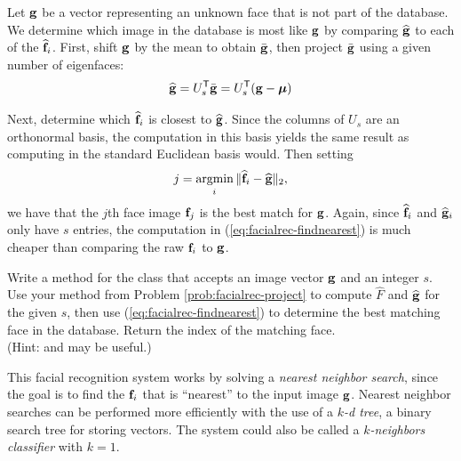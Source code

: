 Let $\mathbf{g}$ be a vector representing an unknown face that is not part of the database.
We determine which image in the database is most like $\mathbf{g}$ by comparing $\widehat{\mathbf{g}}$ to each of the $\widehat{\mathbf{f}}_i$.
First, shift $\mathbf{g}$ by the mean to obtain $\bar{\mathbf{g}}$, then project $\bar{\mathbf{g}}$ using a given number of eigenfaces:
\begin{equation}
    \widehat{\mathbf{g}} = U_s^{\mathsf T}\bar{\mathbf{g}} = U_s^{\mathsf T}(\mathbf{g} - \boldsymbol{\mu})
    \label{eq:facialrec-unknownface}
\end{equation}

Next, determine which $\widehat{\mathbf{f}}_i$ is closest to $\widehat{\mathbf{g}}$.
Since the columns of $U_s$ are an orthonormal basis, the computation in this basis yields the same result as computing in the standard Euclidean basis would.
Then setting
\begin{equation}
j = \mathop{{\text{argmin}}\vphantom{\sim}}\limits_{\displaystyle _{i}} \|\widehat{\f}_i - \widehat{\g}\|_2, %
\label{eq:facialrec-findnearest}
\end{equation}
we have that the $j$th face image $\mathbf{f}_j$ is the best match for $\mathbf{g}$.
Again, since $\widehat{\mathbf{f}}_i$ and $\widehat{\mathbf{g}}_i$ only have $s$ entries, the computation in (\ref{eq:facialrec-findnearest}) is much cheaper than comparing the raw $\mathbf{f}_i$ to $\mathbf{g}$.

\begin{problem} %
Write a method for the  class that accepts an image vector $\mathbf{g}$ and an integer $s$.
Use your method from Problem \ref{prob:facialrec-project} to compute $\widehat{F}$ and $\widehat{\mathbf{g}}$ for the given $s$, then use (\ref{eq:facialrec-findnearest}) to determine the best matching face in the database.
Return the index of the matching face.
\\(Hint:  and  may be useful.)
\label{prob:facialrec-nearest}
\end{problem}

\begin{info}
This facial recognition system works by solving a \emph{nearest neighbor search}, since the goal is to find the $\mathbf{f}_i$ that is ``nearest'' to the input image $\mathbf{g}$.
Nearest neighbor searches can be performed more efficiently with the use of a \emph{$k$-d tree}, a binary search tree for storing vectors.
The system could also be called a \emph{$k$-neighbors classifier} with $k=1$.
\end{info}

